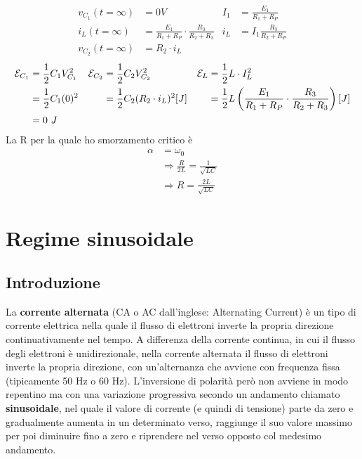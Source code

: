 \documentclass{article}
\begin{document}
\begin{enumerate}[label=\protect\circled{\arabic*}]
\begin{center}
    \end{center}
    \begin{align*}
        v_{C_1}(t=\infty) &= 0V & I_1 &= \frac{E_1}{R_1+R_P} \\ 
        i_L(t=\infty) &=\frac{E_1}{R_1+R_P}\cdot \frac{R_3}{R_2+R_3} & i_L &=I_1 \frac{R_3}{R_2+R_P} \\
        v_{C_2}(t=\infty) &= R_2\cdot i_L
    \end{align*}
    \begin{align*}
        \mathcal{E}_{C_1} &= \frac{1}{2}C_1V_{C_1}^2 & \mathcal{E}_{C_2} &= \frac{1}{2}C_2V_{C_2}^2 & \mathcal{E}_L &= \frac{1}{2}L\cdot I_L^2\\
        &=\frac{1}{2}C_1(0)^2 & &=\frac{1}{2}C_2(R_2\cdot i_L)^2 [J] & &=\frac{1}{2}L\left(\frac{E_1}{R_1+R_P}\cdot \frac{R_3}{R_2+R_3}\right) [J]\\
        &=0 \ J
    \end{align*}
    La R per la quale ho smorzamento critico è
    \begin{align*}
        \alpha &= \omega_0 \\
        &\Rightarrow \frac{R}{2L} = \frac{1}{\sqrt{LC}}\\
        &\Rightarrow R = \frac{2L}{\sqrt{LC}}
    \end{align*}
\end{enumerate}





\section{Regime sinusoidale}
\subsection{Introduzione}
La \textbf{corrente alternata} (CA o AC dall'inglese: Alternating Current) è un tipo di corrente elettrica nella quale il flusso di elettroni inverte la propria direzione continuativamente nel tempo. A differenza della corrente continua, in cui il flusso degli elettroni è unidirezionale, nella corrente alternata il flusso di elettroni inverte la propria direzione, con un'alternanza che avviene con frequenza fissa (tipicamente 50 Hz o 60 Hz). L'inversione di polarità però non avviene in modo repentino ma con una variazione progressiva secondo un andamento chiamato \textbf{sinusoidale}, nel quale il valore di corrente (e quindi di tensione) parte da zero e gradualmente aumenta in un determinato verso, raggiunge il suo valore massimo per poi diminuire fino a zero e riprendere nel verso opposto col medesimo andamento.
\end{document}
